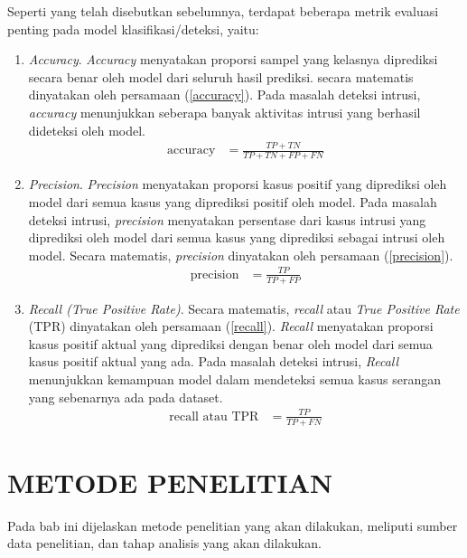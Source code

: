 \documentclass[a4paper,12pt]{report}
\begin{document}
Seperti yang telah disebutkan sebelumnya, terdapat beberapa metrik evaluasi penting pada model klasifikasi/deteksi, yaitu:
\begin{enumerate}
	\item \textit{Accuracy}. \textit{Accuracy} menyatakan proporsi sampel yang kelasnya diprediksi secara benar oleh model dari seluruh hasil prediksi. secara matematis dinyatakan oleh persamaan (\ref{accuracy}). Pada masalah deteksi intrusi, \textit{accuracy} menunjukkan seberapa banyak aktivitas intrusi yang berhasil dideteksi oleh model.
	\begin{equation}
		\begin{split}
			\text{accuracy} &= \frac{TP + TN}{TP + TN + FP + FN} 
		\end{split}
		\label{accuracy}
	\end{equation}
	\item \textit{Precision}. \textit{Precision} menyatakan proporsi kasus positif yang diprediksi oleh model dari semua kasus yang diprediksi positif oleh model. Pada masalah deteksi intrusi, \textit{precision} menyatakan persentase dari kasus intrusi yang diprediksi oleh model dari semua kasus yang diprediksi sebagai intrusi oleh model. Secara matematis, \textit{precision} dinyatakan oleh persamaan (\ref{precision}).
	\begin{equation}
		\begin{split}
			\text{precision} &= \frac{TP}{TP + FP} 
		\end{split}
		\label{precision}
	\end{equation}
	
	\item \textit{Recall (True Positive Rate)}. Secara matematis, \textit{recall} atau \textit{True Positive Rate} (TPR) dinyatakan oleh persamaan (\ref{recall}). \textit{Recall} menyatakan proporsi kasus positif aktual yang diprediksi dengan benar oleh model dari semua kasus positif aktual yang ada. Pada masalah deteksi intrusi, \textit{Recall} menunjukkan kemampuan model dalam mendeteksi semua kasus serangan yang sebenarnya ada pada dataset.
	\begin{equation}
		\begin{split}
			\text{recall atau TPR} &= \frac{TP}{TP + FN} 
		\end{split}
		\label{recall}
	\end{equation}
\end{enumerate}

\chapter{METODE PENELITIAN}
Pada bab ini dijelaskan metode penelitian yang akan dilakukan, meliputi sumber data penelitian, dan tahap analisis yang akan dilakukan.
\end{document}
